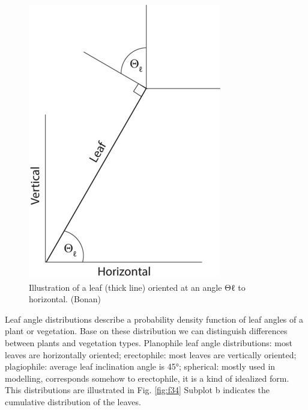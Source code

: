 \documentclass[
  12pt,
  oneside]{book}
\begin{document}
\begin{figure}

{\centering \includegraphics[width=0.8\linewidth]{figures/chap3/f33_Langle} 

}

\caption{Illustration of a leaf (thick line) oriented at an angle Θℓ to horizontal. (Bonan)}\label{fig:f33}
\end{figure}

Leaf angle distributions describe a probability density function of leaf angles of a plant or vegetation. Base on these distribution we can distinguish differences between plants and vegetation types. Planophile leaf angle distributions: most leaves are horizontally oriented; erectophile: most leaves are vertically oriented; plagiophile: average leaf inclination angle is 45°; spherical: mostly used in modelling, corresponds somehow to erectophile, it is a kind of idealized form. This distributions are illustrated in Fig. \ref{fig:f34} Subplot b indicates the cumulative distribution of the leaves.
\end{document}
